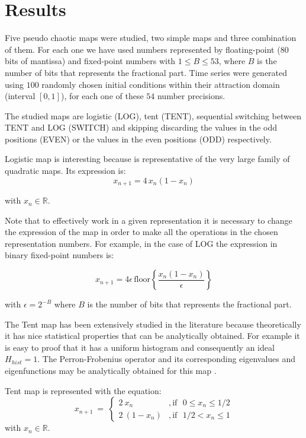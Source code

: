 \section{Results}\label{sec:resultados}

Five pseudo chaotic maps were studied, two simple maps and three combination of them.
For each one we have used numbers represented by floating-point (80 bits of mantissa) and  fixed-point numbers with $1\leq B \leq 53$, where $B$ is the number of bits that represents the fractional part.
Time series were generated using $100$ randomly chosen initial conditions within their attraction domain (interval $[0,1]$), for each one of these $54$ number precisions.

The studied maps are logistic (LOG), tent (TENT), sequential switching between TENT and LOG (SWITCH) and skipping discarding the values in the odd positions (EVEN) or the values in the even positions (ODD) respectively.

Logistic map is interesting because is representative of the very large family of quadratic maps.
Its expression is:
%
\begin{equation}\label{eq:logimap}
x_{n+1}=4\,x_{n}(1-x_{n}) 
\end{equation}

\noindent with $x_n \in \mathbb{R}$.

Note that to effectively work in a given representation it is necessary to change the expression of the map in order to make all the operations in the chosen representation numbers. For example, in the case of LOG the expression in binary fixed-point numbers is:

\begin{equation}\label{eq:logimapB2}
x_{n+1}=4 \epsilon \,\text{floor}\left\{\frac{x_n(1-x_n)}{\epsilon}\right\}
\end{equation}

\noindent with $\epsilon = 2^{-B}$ where $B$ is the number of bits that represents the fractional part.

The Tent map has been extensively studied in the literature because theoretically it has nice statistical properties that can be analytically obtained.
For example it is easy to proof that it has a uniform histogram and consequently an ideal $H_{hist}=1$.
The Perron-Frobenius operator and its corresponding eigenvalues and eigenfunctions may be analytically obtained for this map \cite{Lasota1994}.

Tent map is represented with the equation:
\begin{equation}\label{eq:tentmap}
x_{n+1}~=~ \left\{ \begin{array}{ll}
2~{x_n} &, \textrm{if ~$0\leq x_n\leq 1/2$}\\
2~(1-{x_n}) &, \textrm{if ~$1/2<x_n\leq 1$} 
\end{array} \right. 
\end{equation}
with $x_n \in \mathbb{R}$.

